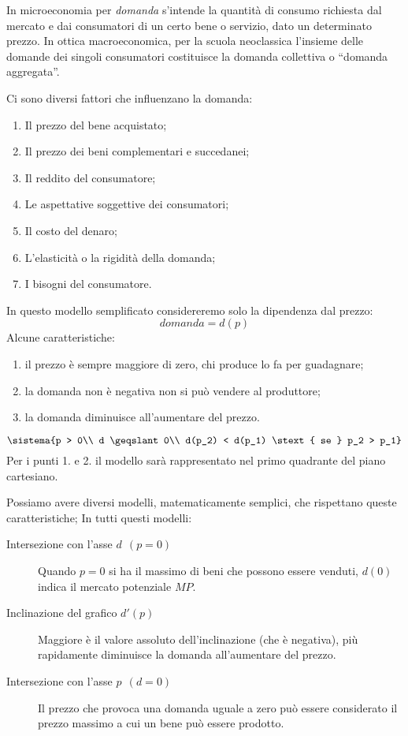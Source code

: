 In microeconomia per \emph{domanda} s'intende la quantità di consumo 
richiesta dal mercato e dai consumatori di un certo bene o servizio, dato 
un determinato prezzo. 
In ottica macroeconomica, per la scuola neoclassica l'insieme 
delle domande dei singoli consumatori costituisce la domanda collettiva o 
``domanda aggregata''.

Ci sono diversi fattori che influenzano la domanda:
\begin{enumerate} [noitemsep]
 \item Il prezzo del bene acquistato;
 \item Il prezzo dei beni complementari e succedanei;
 \item Il reddito del consumatore;
 \item Le aspettative soggettive dei consumatori;
 \item Il costo del denaro;
 \item L'elasticità o la rigidità della domanda;
 \item I bisogni del consumatore.
\end{enumerate}

In questo modello semplificato considereremo solo la dipendenza dal prezzo:
\[domanda = d(p)\]
Alcune caratteristiche:
\begin{enumerate} [nosep]
\item il prezzo è sempre maggiore di zero, chi produce lo fa per guadagnare;
\item la domanda non è negativa non si può vendere al produttore;
\item la domanda diminuisce all'aumentare del prezzo.
\end{enumerate}
\[\sistema{p > 0\\ d \geqslant 0\\ d(p_2) < d(p_1) \stext{ se } p_2 > p_1}\]
Per i punti 1. e 2. il modello sarà rappresentato nel primo quadrante del 
piano cartesiano.

Possiamo avere diversi modelli, matematicamente semplici, che rispettano 
queste caratteristiche; 
In tutti questi modelli:
\begin{description}

\item [Intersezione con l'asse \(d~~(p=0)\)]
Quando \(p = 0\) si ha il massimo di beni che possono essere venduti,
\(d(0)\) indica il mercato potenziale \(MP\).

\item  [Inclinazione del grafico \(d'(p)\)]
Maggiore è il valore assoluto dell'inclinazione (che è negativa), più 
rapidamente diminuisce la domanda all'aumentare del prezzo. 

\item  [Intersezione con l'asse \(p~~(d=0)\)]
Il prezzo che provoca una domanda uguale a zero può essere considerato il 
prezzo massimo a cui un bene può essere prodotto.
\end{description}

